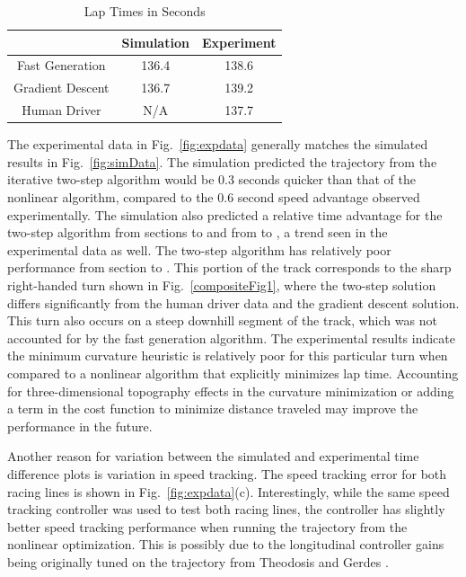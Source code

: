 \documentclass[twocolumn,10pt]{asme2ej}
\newcommand*\circled[1]{\tikz[baseline=(char.base)]{
            \node[shape=circle,draw,inner sep=2pt] (char) {#1};}}
\begin{document}
\begin{table}[h]
\begin{center}
\begin{tabular}{c|cc}
    & Simulation & Experiment \\\hline
Fast Generation& 136.4 & 138.6 \\
Gradient Descent&  136.7 & 139.2 \\
Human Driver& N/A & 137.7 \\\hline
\end{tabular}
\caption{Lap Times in Seconds}\label{tb:laptimes}
\end{center}
\end{table}
The experimental data in Fig.~\ref{fig:expdata} generally matches the simulated results in Fig.~\ref{fig:simData}. The simulation predicted the trajectory from the iterative two-step algorithm would be 0.3 seconds
 quicker than that of the nonlinear algorithm, compared to the 0.6 second speed advantage observed experimentally. 
 The simulation also predicted a relative time advantage for the two-step algorithm from sections \circled{a} to \circled{c}
 and from \circled{e} to \circled{h}, a trend seen in the experimental data as well. The two-step algorithm has relatively poor performance
 from section \circled{c} to \circled{d}. This portion of the track
corresponds to the sharp right-handed turn shown in 
Fig.~\ref{compositeFig1}, where the two-step solution differs significantly from the human driver data and the gradient descent solution. This
turn also occurs on a steep downhill segment of the track, which was not accounted for by the fast generation algorithm. The experimental results
 indicate the minimum curvature heuristic is relatively poor for this particular turn when compared to a nonlinear algorithm 
 that explicitly minimizes lap time. Accounting for three-dimensional topography effects in the curvature minimization or adding a term in the cost function to minimize
 distance traveled may improve the performance in the future.
 
 Another reason for variation between the simulated and experimental time difference plots is variation in speed tracking. 
 The speed tracking error for both racing lines is shown in Fig.~\ref{fig:expdata}(c). Interestingly, while the same speed tracking controller was used to test both racing lines, 
 the controller has slightly better speed tracking performance when running the trajectory from the nonlinear optimization. This is possibly due to the
 longitudinal controller gains being originally tuned on the trajectory from Theodosis and Gerdes \cite{theodosis}. 
\end{document}

